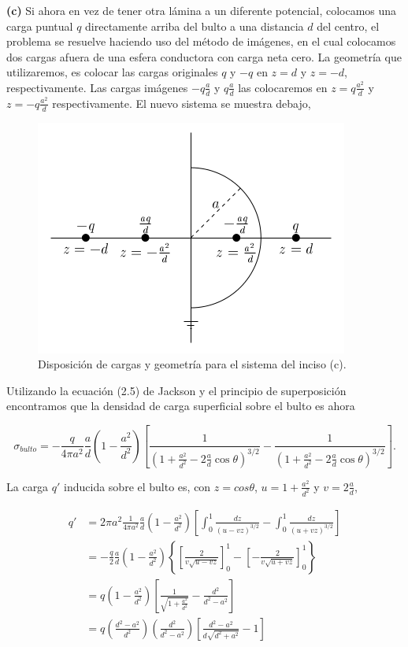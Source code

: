 \documentclass[a4paper,10pt]{article}
\numberwithin{equation}{section}
\begin{document}
\textbf{(c)} Si ahora en vez de tener otra lámina a un diferente potencial, colocamos 
una carga puntual $q$ directamente arriba del bulto a una distancia $d$ del centro, 
el problema se resuelve haciendo uso del método de imágenes, en el cual colocamos 
dos cargas afuera de una esfera conductora con carga neta cero. La geometría que 
utilizaremos, es colocar las cargas originales $q$ y $-q$ en $z=d$ y $z=-d$, 
respectivamente. Las cargas imágenes $-q\frac{a}{d}$ y $q\frac{a}{d}$ las colocaremos 
en $z=q\frac{a^2}{d}$ y $z=-q\frac{a^2}{d}$ respectivamente. El nuevo sistema 
se muestra debajo, 

\begin{figure}[H]
 \center
 \includegraphics[scale=0.8]{problema5fig3}
 \caption{Disposición de cargas y geometría para el sistema del inciso (c).}
\end{figure}

Utilizando la ecuación (2.5) de Jackson \cite{jackson3} y el principio de superposición 
encontramos que la densidad de carga superficial sobre el bulto es ahora

\begin{equation}
 \sigma_{bulto} = - \frac{q}{4\pi a^2}\frac{a}{d}\left(1 - \frac{a^2}{d^2} \right)
 \left[\frac{1}{\left(1 + \frac{a^2}{d^2} - 2\frac{a}{d}\cos{\theta}\right)^{3/2}} 
 - \frac{1}{\left(1 + \frac{a^2}{d^2} - 2\frac{a}{d}\cos{\theta}\right)^{3/2}}\right].
\end{equation}

La carga $q'$ inducida sobre el bulto es, con $z = cos\theta$, $u = 1+\frac{a^2}{d^2}$ y 
$v = 2\frac{a}{d}$, 

\begin{align*}
 q' &= 2\pi a^2 \frac{1}{4\pi a^2}\frac{a}{d}\left(1 - \frac{a^2}{d^2} \right)
 \left[\int_0^1 \frac{dz}{(u-vz)^{3/2}} - \int_0^1 \frac{dz}{(u+vz)^{3/2}} \right] \\
   &= - \frac{q}{2}\frac{a}{d}\left(1 - \frac{a^2}{d^2} \right)\left\{
   \left[\frac{2}{v\sqrt{u - vz}}\right]_0^1 - 
   \left[ - \frac{2}{v\sqrt{u + vz}}\right]_0^1\right\} \\
   &= q \left(1 - \frac{a^2}{d^2} \right) 
   \left[\frac{1}{\sqrt{1 + \frac{a^2}{d^2}}} - \frac{d^2}{d^2 - a^2} \right] \\
   &= q \left(\frac{d^2 - a^2}{d^2}\right) \left(\frac{d^2}{d^2 - a^2} \right)
   \left[\frac{d^2 - a^2}{d\sqrt{d^2 + a^2}} - 1 \right]
\end{align*}
\end{document}
